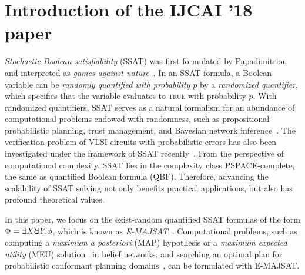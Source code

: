     \section{Introduction of the IJCAI '18 paper}
    \textit{Stochastic Boolean satisfiability} (SSAT) was first formulated by Papadimitriou and interpreted as \emph{games against nature}~\cite{Papadimitriou1985}.
    In an SSAT formula, a Boolean variable can be \textit{randomly quantified with probability $p$} by a \textit{randomized quantifier}, which specifies that the variable evaluates to \textsc{true} with probability $p$.
    With randomized quantifiers, SSAT serves as a natural formalism for an abundance of computational problems endowed with randomness, such as propositional probabilistic planning, trust management, and Bayesian network inference~\cite{Littman2001,SATHandbook-SSAT,Hnich2011}.
    The verification problem of VLSI circuits with probabilistic errors has also been investigated under the framework of SSAT recently~\cite{LeeTC18ProbDesign}.
    From the perspective of computational complexity, SSAT lies in the complexity class PSPACE-complete, the same as quantified Boolean formula (QBF).
    Therefore, advancing the scalability of SSAT solving not only benefits practical applications, but also has profound theoretical values.

    In this paper, we focus on the exist-random quantified SSAT formulas of the form $\Phi=\exists X \random{} Y.\phi$, which is known as \emph{E-MAJSAT}~\cite{Littman1998}.
    Computational problems, such as computing a \textit{maximum a posteriori}
    (MAP) hypothesis or a \textit{maximum expected utility} (MEU) solution~\cite{Dechter1998} in belief networks, and searching an optimal plan for probabilistic conformant planning domains~\cite{Littman1998}, can be formulated with E-MAJSAT.

